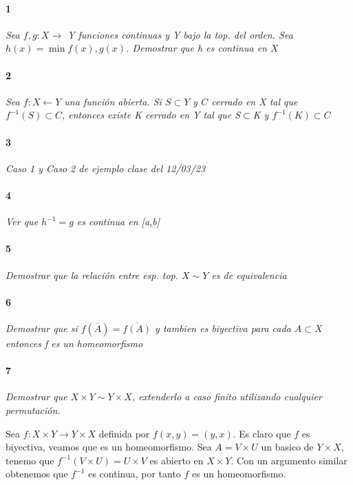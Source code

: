 \documentclass[12pt]{article}
\author{Alumnos: \\Arturo Rodriguez Contreras - 2132880 \\
Jonathan Raymundo Torres Cardenas - 1949731\\
Praxedis Jimenes Ruvalcaba \\
Erick Román Montemayor Treviño - 1957959 \\
Alexis Noe Mora Leyva \\
Everardo Flores Rivera - 2127301}
\begin{document}
\maketitle

\paragraph{1}
\textit{Sea $f,g:X\rightarrow$ Y funciones continuas y Y bajo la top. del orden. Sea $h(x)=\min{f(x),g(x)}$. Demostrar que h es continua en $X$}

\paragraph{2}
\textit{Sea $f:X\leftarrow Y$ una función abierta. Si $S \subset Y$ y $C$ cerrado en X tal que $f^{-1}(S)\subset C$, entonces existe K cerrado en Y tal que S$\subset$K y $f^{-1}(K)\subset C$}

\paragraph{3}
\textit{Caso 1 y Caso 2 de ejemplo clase del 12/03/23} 


\paragraph{4}
\textit{Ver que $h^{-1}=g$ es continua en [a,b]}

\paragraph{5}
\textit{Demostrar que la relación entre esp. top. $X\sim Y$ es de equivalencia}

\paragraph{6}
\textit{Demostrar que si $f(\overline{A})=\overline{f(A)}$ y tambien es biyectiva para cada $A\subset X$ entonces f es un homeomorfismo}

\paragraph{7}
\textit{Demostrar que $X\times Y \sim Y \times X$, extenderlo a caso finito utilizando cualquier permutación.}

Sea $f: X \times Y \to Y \times X$ definida por $f(x,y)=(y,x)$. Es claro que $f$ es biyectiva, veamos que es un homeomorfismo. Sea $A=V \times U$ un basico de $Y \times X$, 
tenemo que $f^{-1}(V \times U)=U \times V$ es abierto en $X \times Y$. Con un argumento similar obtenemos que $f^{-1}$ es continua, por tanto $f$ es un homeomorfismo.
\end{document}
